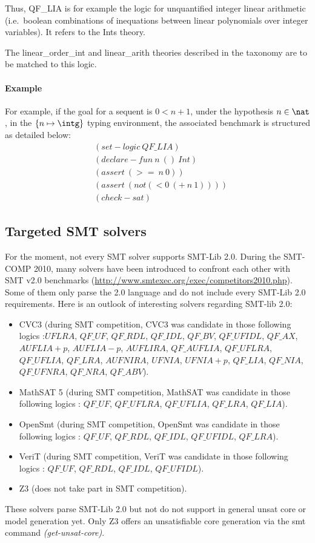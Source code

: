 Thus, QF\_LIA is for example the logic for unquantified integer linear arithmetic (i.e.\ boolean combinations of inequations between linear polynomials over integer variables). It refers to the Ints theory.

The linear\_order\_int and linear\_arith theories described in the taxonomy\cite{TAXO09} are to be matched to this logic. 

\paragraph{Example}
For example, if the goal for a sequent is $0 < n + 1$, under the hypothesis $n \in \nat$, in the $\{n \mapsto \intg\}$ typing environment, the associated benchmark is structured as detailed below:
\begin{align*}           
&(set-logic~QF\_LIA)                     \\
&(declare-fun~n~()~Int)                 \\
&(assert~(>=~n~0))						\\
&(assert~(not (< 0~(+~n~1))))			\\
&(check-sat)
\end{align*}


\subsection{Targeted SMT solvers}
For the moment, not every SMT solver supports SMT-Lib 2.0. During the SMT-COMP 2010, many solvers have been introduced to confront each other with SMT v2.0 benchmarks (\url{http://www.smtexec.org/exec/competitors2010.php}). Some of them only parse the 2.0 language and do not include every SMT-Lib 2.0 requirements. Here is an outlook of interesting solvers regarding SMT-lib 2.0:

\begin{itemize}
\item CVC3 \cite{CVC3}(during SMT competition, CVC3 was candidate in those following logics :$UFLRA$, $QF\_UF$, $QF\_RDL$, $QF\_IDL$, $QF\_BV$, $QF\_UFIDL$, $QF\_AX$, $AUFLIA+p$, $AUFLIA-p$, $AUFLIRA$, $QF\_AUFLIA$, $QF\_UFLRA$, $QF\_UFLIA$, $QF\_LRA$, $AUFNIRA$, $UFNIA$, $UFNIA+p$, $QF\_LIA$, $QF\_NIA$, $QF\_UFNRA$, $QF\_NRA$, $QF\_ABV$). 

\item MathSAT 5 \cite{MATHSAT} (during SMT competition, MathSAT was candidate in those following logics : $QF\_UF$, $QF\_UFLRA$, $QF\_UFLIA$, $QF\_LRA$, $QF\_LIA$).

\item OpenSmt \cite{OPENSMT}(during SMT competition, OpenSmt was candidate in those following logics : $QF\_UF$, $QF\_RDL$, $QF\_IDL$, $QF\_UFIDL$, $QF\_LRA$).

\item VeriT\cite{VERIT} (during SMT competition, VeriT was candidate in those following logics : $QF\_UF$, $QF\_RDL$, $QF\_IDL$, $QF\_UFIDL$).

\item Z3 \cite{Z3} (does not take part in SMT competition). 

\end{itemize}

These solvers parse SMT-Lib 2.0 but not do not support in general unsat core or model generation yet. Only Z3 offers an unsatisfiable core generation via the smt command \textit{(get-unsat-core)}.